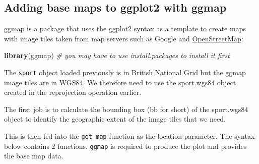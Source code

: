 \documentclass[]{article}
\newenvironment{Shaded}{}{}
\newcommand{\KeywordTok}[1]{\textcolor[rgb]{0.00,0.44,0.13}{\textbf{{#1}}}}
\newcommand{\DecValTok}[1]{\textcolor[rgb]{0.25,0.63,0.44}{{#1}}}
\newcommand{\FloatTok}[1]{\textcolor[rgb]{0.25,0.63,0.44}{{#1}}}
\newcommand{\StringTok}[1]{\textcolor[rgb]{0.25,0.44,0.63}{{#1}}}
\newcommand{\CommentTok}[1]{\textcolor[rgb]{0.38,0.63,0.69}{\textit{{#1}}}}
\newcommand{\NormalTok}[1]{{#1}}
\begin{document}
\subsection{Adding base maps to ggplot2 with
ggmap}\label{adding-base-maps-to-ggplot2-with-ggmap}

\href{http://journal.r-project.org/archive/2013-1/kahle-wickham.pdf}{ggmap}
is a package that uses the ggplot2 syntax as a template to create maps
with image tiles taken from map servers such as Google and
\href{http://www.openstreetmap.org/}{OpenStreetMap}:

\begin{Shaded}
\begin{Highlighting}[]
\KeywordTok{library}\NormalTok{(ggmap)  }\CommentTok{# you may have to use install.packages to install it first}
\end{Highlighting}
\end{Shaded}

The \texttt{sport} object loaded previously is in British National Grid
but the ggmap image tiles are in WGS84. We therefore need to use the
sport.wgs84 object created in the reprojection operation earlier.

The first job is to calculate the bounding box (bb for short) of the
sport.wgs84 object to identify the geographic extent of the image tiles
that we need.

\begin{Shaded}
\end{Shaded}

This is then fed into the \texttt{get\_map} function as the location
parameter. The syntax below contains 2 functions. \texttt{ggmap} is
required to produce the plot and provides the base map data.
\end{document}
